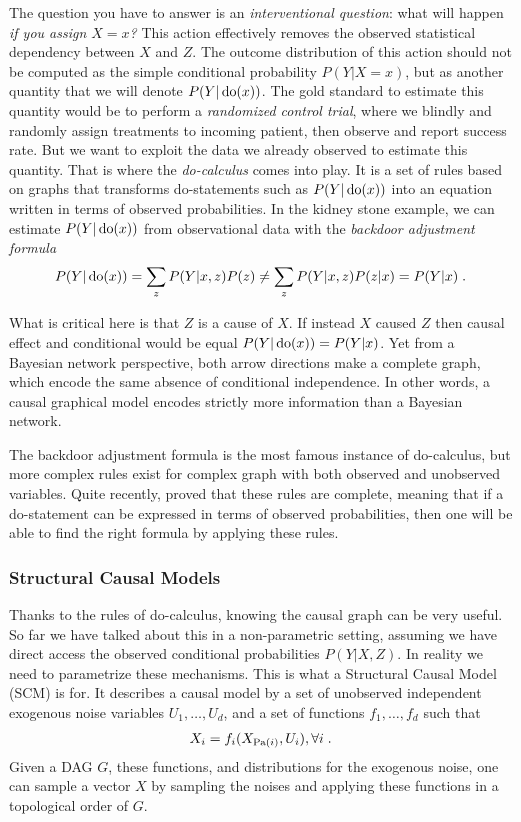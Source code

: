 The question you have to answer is an \textit{interventional question}: what will happen \textit{if you assign $X=x$?} This action effectively removes the observed statistical dependency between $X$ and $Z$. The outcome distribution of this action should not be computed as the simple conditional probability $P(Y|X=x)$, but as another quantity that we will denote $P(Y| \operatorname{\mathrm{do}}(x))$. The gold standard to estimate this quantity would be to perform a \textit{randomized control trial}, where we blindly and randomly assign treatments to incoming patient, then observe and report success rate. But we want to exploit the data we already observed to estimate this quantity. That is where the \textit{do-calculus} comes into play. It is a set of rules based on graphs that transforms do-statements such as $P(Y| \operatorname{\mathrm{do}}(x))$ into an equation written in terms of observed probabilities. 
In the kidney stone example, we can estimate $P(Y| \operatorname{\mathrm{do}}(x))$ from observational data with the \textit{backdoor adjustment formula}
\begin{align}
    P(Y|\operatorname{\mathrm{do}}(x)) = \sum_z P(Y | x, z) P(z) 
    \neq \sum_z P(Y | x, z) P(z|x) = P(Y | x) \; .
    \label{eq:backdoor_adjustment}
\end{align}

What is critical here is that $Z$ is a cause of $X$. If instead $X$ caused $Z$ then causal effect and conditional would be equal $P(Y|\operatorname{\mathrm{do}}(x)) = P(Y | x)$. Yet from a Bayesian network perspective, both arrow directions make a complete graph, which encode the same absence of conditional independence. In other words, a causal graphical model encodes strictly more information than a Bayesian network.

The backdoor adjustment formula is the most famous instance of do-calculus, but more complex rules exist for complex graph with both observed and unobserved variables. Quite recently, \citet{huang2012pearl} proved that these rules are complete, meaning that if a do-statement can be expressed in terms of observed probabilities, then one will be able to find the right formula by applying these rules. 


\subsubsection{Structural Causal Models}

Thanks to the rules of do-calculus, knowing the causal graph can be very useful. So far we have talked about this in a non-parametric setting, assuming we have direct access the observed conditional probabilities $P(Y|X, Z)$. In reality we need to parametrize these mechanisms. This is what a Structural Causal Model (SCM) is for. It describes a causal model by a set of unobserved independent exogenous noise variables $U_1, \dots, U_d$, and a set of functions $f_1, \dots, f_d$ such that
\begin{align}
    X_i = f_i(X_{\operatorname{\mathrm{Pa}}(i)}, U_i), \forall i \;.
    \label{eq:scm}
\end{align}
Given a DAG $G$, these functions, and distributions for the exogenous noise, one can sample a vector $X$ by sampling the noises and applying these functions in a topological order of $G$.

